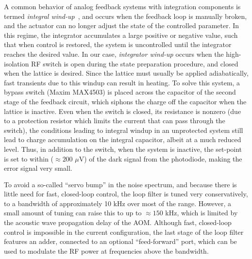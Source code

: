\documentclass[twocolumn,aps,pra,showpacs,preprintnumbers,bibnotes]{revtex4-1}
\begin{document}
A common behavior of analog feedback systems with integration components is termed \textit{integral wind-up}~\cite{Bechhoefer2005}, and occurs when the feedback loop is manually broken, and the actuator can no longer adjust the state of the controlled parameter. 
In this regime, the integrator accumulates a large positive or negative value, such that when control is restored, the system is uncontrolled until the integrator reaches the desired value.
In our case, \textit{integrator wind-up} occurs when the high-isolation RF switch is open during the state preparation procedure, and closed when the lattice is desired. 
Since the lattice must usually be applied adiabatically, fast transients due to this windup can result in heating.
To solve this system, a bypass switch (Maxim MAX4503) is placed across the capacitor of the second stage of the feedback circuit, which siphons the charge off the capacitor when the lattice is inactive.
Even when the switch is closed, its resistance is nonzero (due to a protection resistor which limits the current that can pass through the switch), the conditions leading to integral windup in an unprotected system still lead to charge accumulation on the integral capacitor, albeit at a much reduced level.
Thus, in addition to the switch, when the system is inactive, the set-point is set to within ($\approx 200$ $\mu$V) of the dark signal from the photodiode, making the error signal very small.

To avoid a so-called ``servo bump'' in the noise spectrum, and because there is little need for fast, closed-loop control, the loop filter is tuned very conservatively, to a bandwidth of approximately 10 kHz over most of the range.
However, a small amount of tuning can raise this to up to $\approx150$ kHz, which is limited by the acoustic wave propagation delay of the AOM.
Although fast, closed-loop control is impossible in the current configuration, the last stage of the loop filter features an adder, connected to an optional ``feed-forward'' port, which can be used to modulate the RF power at frequencies above the bandwidth.
\end{document}
